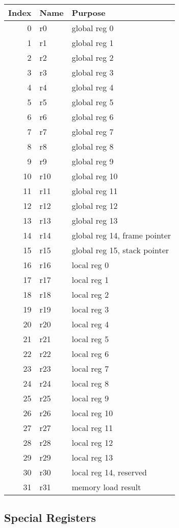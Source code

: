 \documentclass[10pt,DIV12]{scrartcl}
\begin{document}
\begin{tabular}{rll}
\toprule
Index & Name & Purpose \\
\midrule
0 & r0 & global reg 0 \\
1 & r1 & global reg 1 \\
2 & r2 & global reg 2 \\
3 & r3 & global reg 3 \\
4 & r4 & global reg 4 \\
5 & r5 & global reg 5 \\
6 & r6 & global reg 6 \\
7 & r7 & global reg 7 \\
8 & r8 & global reg 8 \\
9 & r9 & global reg 9 \\
10 & r10 & global reg 10 \\
11 & r11 & global reg 11 \\
12 & r12 & global reg 12 \\
13 & r13 & global reg 13 \\
14 & r14 & global reg 14, frame pointer \\
15 & r15 & global reg 15, stack pointer \\
\cmidrule{1-3}
16 & r16 & local reg 0 \\
17 & r17 & local reg 1 \\
18 & r18 & local reg 2 \\
19 & r19 & local reg 3 \\
20 & r20 & local reg 4 \\
21 & r21 & local reg 5 \\
22 & r22 & local reg 6 \\
23 & r23 & local reg 7 \\
24 & r24 & local reg 8 \\
25 & r25 & local reg 9 \\
26 & r26 & local reg 10 \\
27 & r27 & local reg 11 \\
28 & r28 & local reg 12 \\
29 & r29 & local reg 13 \\
30 & r30 & local reg 14, reserved \\
31 & r31 & memory load result \\
\bottomrule 
\end{tabular}

\subsection{Special Registers}
\end{document}
